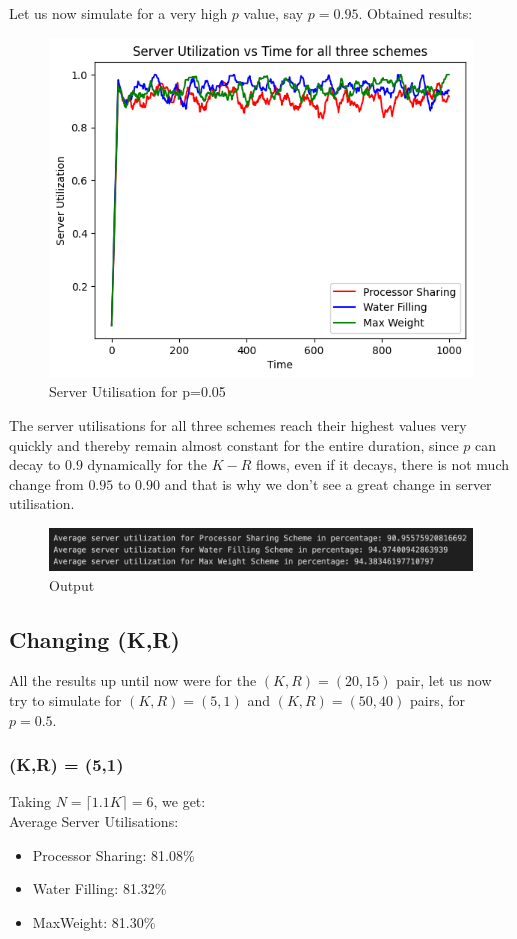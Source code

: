 \documentclass[11pt, a4paper]{article}
\begin{document}
Let us now simulate for a very high $p$ value, say $p=0.95$. Obtained results:
\begin{figure}[H]
     \centering
     \includegraphics[scale=0.5]{su3.png}
     \caption{Server Utilisation for p=0.05}
\end{figure}

The server utilisations for all three schemes reach their highest values very quickly and thereby remain almost constant for the entire duration, since $p$ can decay to $0.9$ dynamically for the $K-R$ flows, even if it decays, there is not much change from $0.95$ to $0.90$ and that is why we don't see a great change in server utilisation.

\begin{figure}[H]
     \centering
     \includegraphics[scale=0.2]{su4.png}
     \caption{Output}
\end{figure}

\subsection{Changing (K,R)}
All the results up until now were for the $(K,R) = (20,15)$ pair, let us now try to simulate for $(K,R) = (5,1)$ and $(K,R) = (50,40)$ pairs, for $p=0.5$.

\subsubsection{(K,R) = (5,1)}
Taking $N=\lceil 1.1K \rceil=6$, we get:\\
Average Server Utilisations:
\begin{itemize}
\item Processor Sharing: 81.08\%
\item Water Filling: 81.32\%
\item MaxWeight: 81.30\%
\end{itemize}
\end{document}

